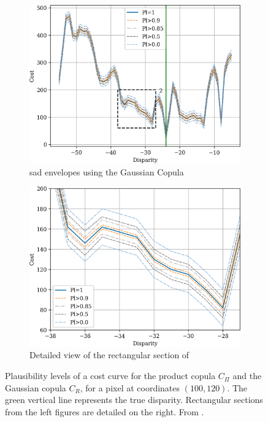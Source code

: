 \begin{figure}
\begin{subfigure}[t]{0.48\linewidth}
    \end{subfigure}
    \begin{subfigure}[t]{0.48\linewidth}
        \centering
        \includegraphics[width=\linewidth]{Images/Chap_4/bel_100_120.png}
        \caption{\acrshort{sad} envelopes using the Gaussian Copula}
        \label{fig:belief_gaussian}
    \end{subfigure}\hfill
    \begin{subfigure}[t]{0.48\linewidth}
        \centering
        \includegraphics[width=\linewidth]{Images/Chap_4/bel_100_120_zoom.png}
        \caption{Detailed view of the rectangular section of }
        \label{fig:belief_gaussian_zoom}
    \end{subfigure}
    \caption{Plausibility levels of a cost curve for the product copula $C_\Pi$ and the Gaussian copula $C_R$, for a pixel at coordinates $(100, 120)$. The green vertical line represents the true disparity. Rectangular sections from the left figures are detailed on the right. From \cite{malinowski_uncertainty_2024}.}
    \label{fig:belief_curves}
\end{figure}

